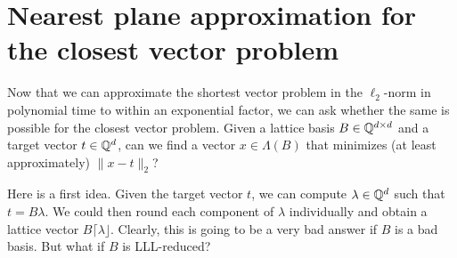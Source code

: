\section{Nearest plane approximation for the closest vector problem}

Now that we can approximate the shortest vector problem in the $\ell_2$-norm
in polynomial time to within an exponential factor,
we can ask whether the same is possible for the closest vector problem.
Given a lattice basis $B \in \mathbb{Q}^{d \times d}$ and a target vector $t \in \mathbb{Q}^d$,
can we find a vector $x \in \Lambda(B)$ that minimizes (at least approximately) $\|x-t\|_2$?

Here is a first idea.
Given the target vector $t$, we can compute $\lambda \in \mathbb{Q}^d$
such that $t = B \lambda$.
We could then round each component of $\lambda$ individually
and obtain a lattice vector $B \lceil \lambda \rfloor$.
Clearly, this is going to be a very bad answer if $B$ is a bad basis.
But what if $B$ is LLL-reduced?

